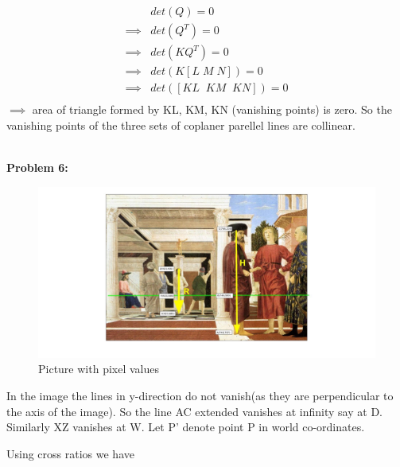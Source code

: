 \documentclass[a4paper]{article}
\begin{document}
\begin{equation*} 
\begin{split}
& det(Q) = 0 \\
\implies & det(Q^T)=0 \\
\implies & det(KQ^T)=0\\
\implies & det(K[L\; M\; N]) =0 \\
\implies & det([KL\;\; KM\;\; KN]) = 0\\
\end{split}
\end{equation*}
$\implies$ area of triangle formed by KL, KM, KN (vanishing points) is zero. So the vanishing points of the three sets of coplaner parellel lines are collinear. 


\hrulefill\\


\textbf{\newline Problem 6:}

\begin{figure}[h!]
 \centering
\caption{Picture with pixel values}
\includegraphics[width=1\textwidth]{Q6/measuredpicture.jpg}
\end{figure}

In the image the lines in y-direction do not vanish(as they are perpendicular to the axis of the image). So the line AC extended vanishes at infinity say at D. Similarly XZ vanishes at W. Let P' denote point P in world co-ordinates.

Using cross ratios we have
\end{document}
